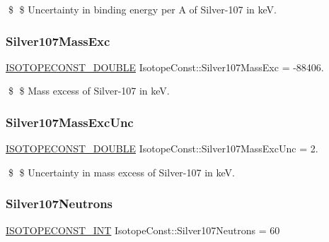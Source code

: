 \$ \$ Uncertainty in binding energy per A of Silver-\/107 in keV. \mbox{\label{group___isotope_const-_silver-_ag107_ga113fca13777f14cc25fe2c776ccbaefc}} 
\subsubsection{\texorpdfstring{Silver107\+Mass\+Exc}{Silver107MassExc}}
{\footnotesize\ttfamily \mbox{\hyperlink{group___isotope_const-_macros_ga8f45a7272ce02c0b4c65c44636ed719a}{I\+S\+O\+T\+O\+P\+E\+C\+O\+N\+S\+T\+\_\+\+D\+O\+U\+B\+LE}} Isotope\+Const\+::\+Silver107\+Mass\+Exc = -\/88406.}

\$ \$ Mass excess of Silver-\/107 in keV. \mbox{\label{group___isotope_const-_silver-_ag107_ga89707deee1f51b821b51b7a46c105ccc}} 
\subsubsection{\texorpdfstring{Silver107\+Mass\+Exc\+Unc}{Silver107MassExcUnc}}
{\footnotesize\ttfamily \mbox{\hyperlink{group___isotope_const-_macros_ga8f45a7272ce02c0b4c65c44636ed719a}{I\+S\+O\+T\+O\+P\+E\+C\+O\+N\+S\+T\+\_\+\+D\+O\+U\+B\+LE}} Isotope\+Const\+::\+Silver107\+Mass\+Exc\+Unc = 2.}

\$ \$ Uncertainty in mass excess of Silver-\/107 in keV. \mbox{\label{group___isotope_const-_silver-_ag107_ga311c656f2a336d8c2a8ab659834ec27a}} 
\subsubsection{\texorpdfstring{Silver107\+Neutrons}{Silver107Neutrons}}
{\footnotesize\ttfamily \mbox{\hyperlink{group___isotope_const-_macros_ga5f18360b3e99483a35c32d789e62621c}{I\+S\+O\+T\+O\+P\+E\+C\+O\+N\+S\+T\+\_\+\+I\+NT}} Isotope\+Const\+::\+Silver107\+Neutrons = 60}

